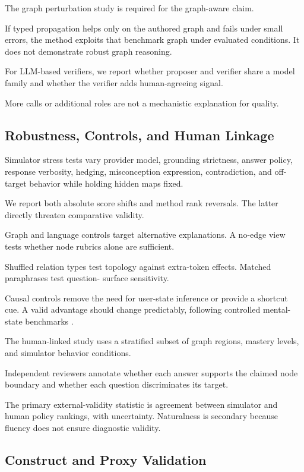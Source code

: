 The graph perturbation study is required for the graph-aware claim.

If typed propagation helps only on the authored graph and fails under small errors, the method exploits
that benchmark graph under evaluated conditions. It does not demonstrate robust graph reasoning.

For LLM-based verifiers, we report whether proposer and verifier share a model family and whether the
verifier adds human-agreeing signal.

More calls or additional roles are not a mechanistic explanation for quality.

\subsection{Robustness, Controls, and Human Linkage}

Simulator stress tests vary provider model, grounding strictness, answer policy, response verbosity,
hedging, misconception expression, contradiction, and off-target behavior while holding hidden maps
fixed.

We report both absolute score shifts and method rank reversals. The latter directly threaten comparative
validity.

Graph and language controls target alternative explanations. A no-edge view tests whether node rubrics
alone are sufficient.

Shuffled relation types test topology against extra-token effects. Matched paraphrases test question-
surface sensitivity.

Causal controls remove the need for user-state inference or provide a shortcut cue. A valid advantage
should change predictably, following controlled mental-state benchmarks \citep{gandhi2023bigtom}.

The human-linked study uses a stratified subset of graph regions, mastery levels, and simulator behavior
conditions.

Independent reviewers annotate whether each answer supports the claimed node boundary and whether each
question discriminates its target.

The primary external-validity statistic is agreement between simulator and human policy rankings, with
uncertainty. Naturalness is secondary because fluency does not ensure diagnostic validity.

\subsection{\sagesim Construct and Proxy Validation}

